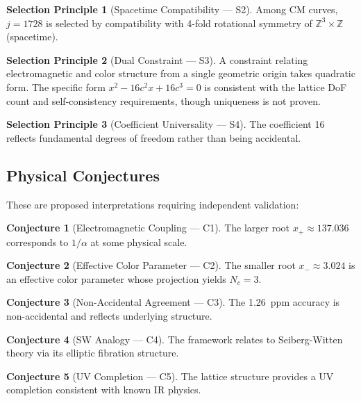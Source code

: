\documentclass[11pt,a4paper]{article}
\theoremstyle{definition}
\newtheorem{selectionprinciple}{Selection Principle}
\newtheorem{conjecture}{Conjecture}
\theoremstyle{remark}
\newcommand{\Zthree}{\mathbb{Z}^3}
\begin{document}
\begin{selectionprinciple}[Spacetime Compatibility --- S2]
Among CM curves, $j = 1728$ is selected by compatibility with 4-fold rotational symmetry of $\Zthree \times \mathbb{Z}$ (spacetime).
\end{selectionprinciple}

\begin{selectionprinciple}[Dual Constraint --- S3]
A constraint relating electromagnetic and color structure from a single geometric origin takes quadratic form. The specific form $x^2 - 16c^2 x + 16c^3 = 0$ is consistent with the lattice DoF count and self-consistency requirements, though uniqueness is not proven.
\end{selectionprinciple}

\begin{selectionprinciple}[Coefficient Universality --- S4]
The coefficient 16 reflects fundamental degrees of freedom rather than being accidental.
\end{selectionprinciple}

\subsection{Physical Conjectures}

These are proposed interpretations requiring independent validation:

\begin{conjecture}[Electromagnetic Coupling --- C1]
The larger root $x_+ \approx 137.036$ corresponds to $1/\alpha$ at some physical scale.
\end{conjecture}

\begin{conjecture}[Effective Color Parameter --- C2]
The smaller root $x_- \approx 3.024$ is an effective color parameter whose projection yields $N_c = 3$.
\end{conjecture}

\begin{conjecture}[Non-Accidental Agreement --- C3]
The 1.26~ppm accuracy is non-accidental and reflects underlying structure.
\end{conjecture}

\begin{conjecture}[SW Analogy --- C4]
The framework relates to Seiberg-Witten theory via its elliptic fibration structure.
\end{conjecture}

\begin{conjecture}[UV Completion --- C5]
The lattice structure provides a UV completion consistent with known IR physics.
\end{conjecture}
\end{document}
